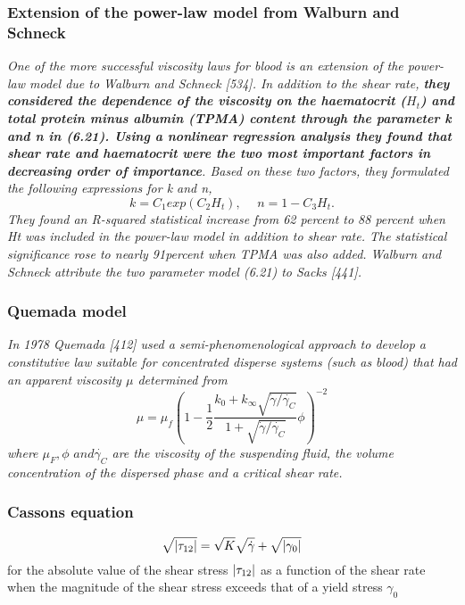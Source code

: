 \documentclass[11pt,letterpaper]{article}
\begin{document}
\subsubsection*{Extension of
the power-law model from Walburn and Schneck}
\textit{
One of the more successful viscosity laws for blood is an extension of
the power-law model due to Walburn and Schneck [534]. In addition to the
shear rate, \textbf{they considered the dependence of the viscosity on the haematocrit
($H_t$) and total protein minus albumin (TPMA) content through the parameter k and n in (6.21). Using a nonlinear regression analysis they found that
shear rate and haematocrit were the two most important factors in decreasing
order of importance}. Based on these two factors, they formulated the following
expressions for k and n,\begin{equation}
k = C_1 exp(C_2H_t), \hspace{15pt} n=1-C_3H_t.
\end{equation}
They found an R-squared statistical increase from 62 percent to 88 percent when Ht was included in the power-law model in addition to shear rate. The statistical significance rose to nearly 91percent  when TPMA was also added. Walburn and Schneck attribute the two parameter model (6.21) to Sacks [441].
}

\subsubsection*{Quemada model} \textit{In 1978 Quemada [412] used a semi-phenomenological approach to develop a constitutive law suitable for concentrated disperse systems (such as blood) that had an apparent viscosity $\mu$ determined from
\begin{equation}
    \mu = \mu_f (1 -\frac{1}{2}\frac{k_0+k_{\infty}\sqrt{\Dot{\gamma}/\Dot{\gamma_C}}}{1+\sqrt{\Dot{\gamma}/\Dot{\gamma_C}}}\phi)^{-2}
\end{equation}
where $\mu_F, \phi \hspace{4pt }and \Dot{\gamma_C}$ are the viscosity of the suspending fluid, the volume concentration of the dispersed phase and a critical shear rate.
}



\subsubsection*{Cassons equation}
\begin{equation}
    \sqrt{\abs{\tau_{12}}}= \sqrt{K}\sqrt{\Dot{\gamma}}+\sqrt{\abs{\gamma_0}}
\end{equation}
for the absolute value of the shear stress $\abs{\tau_{12}}$ as a function of the shear rate when the magnitude of the shear stress exceeds that of a yield stress $\gamma_0$
\end{document}
